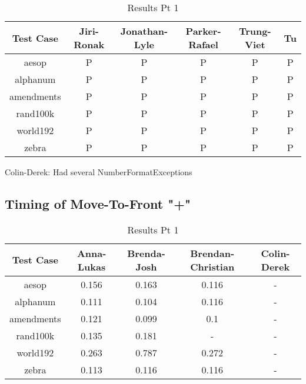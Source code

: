 \documentclass[12pt]{article}
\begin{document}
\begin{table}[ht]
\caption{Results Pt 1}%
\centering %
\begin{tabular}{c c c c c c}%
\hline \hline                        %
Test Case & Jiri-Ronak & Jonathan-Lyle & Parker-Rafael & Trung-Viet & Tu \\ [0.5ex]%
\hline                  %
aesop & P & P & P & P & P\\  %
alphanum & P & P & P & P & P\\
amendments & P & P & P & P & P\\
rand100k & P & P & P & P & P\\
world192 & P & P & P & P & P\\
zebra & P & P & P & P & P\\
\hline                  %
\end{tabular}
\label{table:nonlin}
\end{table}

Colin-Derek: Had several NumberFormatExceptions

\newpage
\subsection{Timing of Move-To-Front "+"}

\begin{table}[ht]
\caption{Results Pt 1}%
\centering %
\begin{tabular}{c c c c c}%
\hline \hline                        %
Test Case & Anna-Lukas & Brenda-Josh & Brendan-Christian & Colin-Derek \\ [0.5ex]%
\hline                  %
aesop & 0.156 & 0.163 & 0.116 & - \\
alphanum & 0.111 & 0.104 & 0.116 & - \\
amendments & 0.121 & 0.099 & 0.1 & - \\
rand100k & 0.135 & 0.181 & - & - \\
world192 & 0.263 & 0.787 & 0.272 & - \\
zebra & 0.113 & 0.116 & 0.116 & - \\
\hline                  %
\end{tabular}
\label{table:nonlin}
\end{table}
\end{document}
